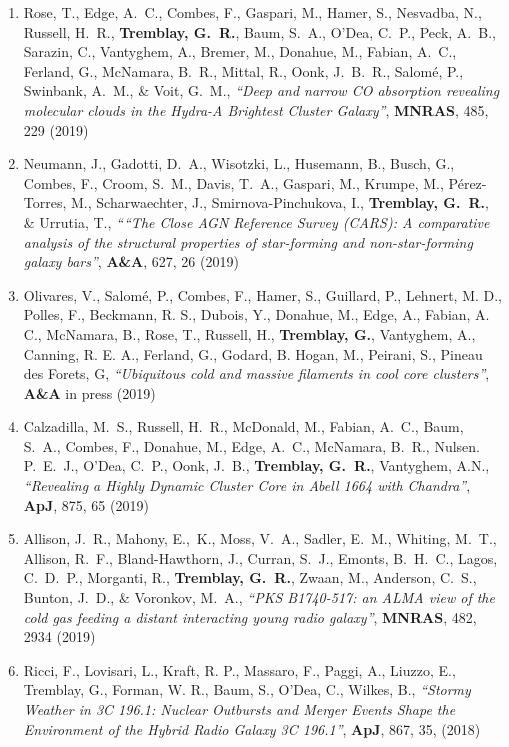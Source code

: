 \documentclass[11pt]{article}
\begin{document}
\begin{enumerate}[resume]
\item Rose, T., Edge, A.~C., Combes, F., Gaspari, M., Hamer, S., Nesvadba, N.,
Russell, H.~R., \textbf{Tremblay, G.~R.}, Baum, S.~A., O'Dea, C.~P., Peck, A.~B.,
Sarazin, C., Vantyghem, A., Bremer, M., Donahue, M., Fabian, A.~C., Ferland, G.,
McNamara, B.~R., Mittal, R., Oonk, J.~B.~R., Salom\'{e}, P., Swinbank, A.~M.,
\& Voit, G.~M., \textit{``Deep and narrow CO absorption revealing molecular clouds in the Hydra-A Brightest Cluster Galaxy''}, \textbf{MNRAS}, 485, 229 (2019)


\item Neumann, J., Gadotti, D.~A., Wisotzki, L., Husemann, B., Busch, G.,
Combes, F., Croom, S.~M., Davis, T.~A., Gaspari, M., Krumpe, M., P\'{e}rez-Torres,
M., Scharwaechter, J., Smirnova-Pinchukova, I., \textbf{Tremblay, G.~R.},
\& Urrutia, T., \textit{````The Close AGN Reference Survey (CARS): A comparative analysis of the structural properties of star-forming and non-star-forming galaxy bars''},
\textbf{A\&A}, 627, 26 (2019)


\item Olivares, V., Salomé, P., Combes, F., Hamer, S., Guillard, P., Lehnert, M. D., Polles, F., Beckmann, R. S., Dubois, Y., Donahue, M., Edge, A., Fabian, A. C., McNamara, B., Rose, T., Russell, H., \textbf{Tremblay, G.}, Vantyghem, A., Canning, R. E. A., Ferland, G., Godard, B. Hogan, M., Peirani, S., Pineau des Forets, G, \textit{``Ubiquitous cold and massive filaments in cool core clusters''}, \textbf{A\&A} in press (2019)



\item Calzadilla, M.~S., Russell, H.~R., McDonald, M., Fabian, A.~C., Baum, S.~A., Combes, F., Donahue, M., Edge, A.~C., McNamara, B.~R., Nulsen. P.~E.~J., O'Dea, C.~P., Oonk, J.~B., \textbf{Tremblay, G.~R.}, Vantyghem, A.N., \textit{``Revealing a Highly Dynamic Cluster Core in Abell 1664 with Chandra''}, \textbf{ApJ}, 875, 65 (2019)




\item Allison, J.~R., Mahony, E.,~K., Moss, V.~A., Sadler, E.~M., Whiting, M.~T.,
Allison, R.~F., Bland-Hawthorn, J., Curran, S.~J., Emonts, B.~H.~C., Lagos, C.~D.~P.,
Morganti, R., \textbf{Tremblay, G.~R.}, Zwaan, M., Anderson, C.~S.,
Bunton, J.~D., \& Voronkov, M.~A., \textit{``PKS B1740-517: an ALMA view of the
cold gas feeding a distant interacting young radio galaxy''}, \textbf{MNRAS}, 482,
2934 (2019)


\item Ricci, F., Lovisari, L., Kraft, R. P., Massaro, F., Paggi, A., Liuzzo, E., Tremblay, G., Forman, W. R., Baum, S., O'Dea, C., Wilkes, B., \textit{``Stormy Weather in 3C 196.1: Nuclear Outbursts and Merger Events Shape the Environment of the Hybrid Radio Galaxy 3C 196.1''}, \textbf{ApJ}, 867, 35, (2018)


\end{enumerate}
\end{document}
